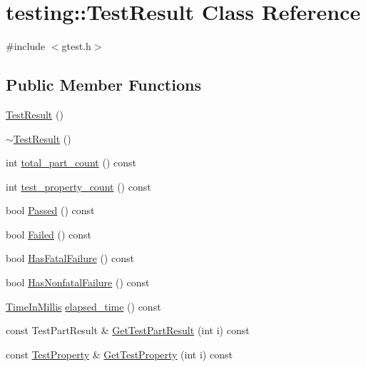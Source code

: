\hypertarget{classtesting_1_1TestResult}{}\section{testing\+::Test\+Result Class Reference}
\label{classtesting_1_1TestResult}


{\ttfamily \#include $<$gtest.\+h$>$}

\subsection*{Public Member Functions}
\begin{DoxyCompactItemize}
\item 
\mbox{\hyperlink{classtesting_1_1TestResult_a5cf5dd6f416b7334ea601aab21a2fda5}{Test\+Result}} ()
\item 
\mbox{\hyperlink{classtesting_1_1TestResult_a41f407680b725b75d7eadc3230bc3315}{$\sim$\+Test\+Result}} ()
\item 
int \mbox{\hyperlink{classtesting_1_1TestResult_a6174aa4019dcda7c34d776b5741c9032}{total\+\_\+part\+\_\+count}} () const
\item 
int \mbox{\hyperlink{classtesting_1_1TestResult_afe4523257bbea8bc63b0950b702790be}{test\+\_\+property\+\_\+count}} () const
\item 
bool \mbox{\hyperlink{classtesting_1_1TestResult_acf7e6e72f05a0545c48ea48e7f8851df}{Passed}} () const
\item 
bool \mbox{\hyperlink{classtesting_1_1TestResult_afacc37e8b43c8574e4101bc61723c769}{Failed}} () const
\item 
bool \mbox{\hyperlink{classtesting_1_1TestResult_a30e00d4076ae07fb5ad7b623d9dc1fe4}{Has\+Fatal\+Failure}} () const
\item 
bool \mbox{\hyperlink{classtesting_1_1TestResult_a510564fa67b485ed4589a259f2a032d6}{Has\+Nonfatal\+Failure}} () const
\item 
\mbox{\hyperlink{namespacetesting_a992de1d091ce660f451d1e8b3ce30fd6}{Time\+In\+Millis}} \mbox{\hyperlink{classtesting_1_1TestResult_a717e05e00d4af5cb809433e343ab63af}{elapsed\+\_\+time}} () const
\item 
const Test\+Part\+Result \& \mbox{\hyperlink{classtesting_1_1TestResult_a765c1e734ac08115757b343d57226bba}{Get\+Test\+Part\+Result}} (int i) const
\item 
const \mbox{\hyperlink{classtesting_1_1TestProperty}{Test\+Property}} \& \mbox{\hyperlink{classtesting_1_1TestResult_a6c2f478dbce36b57d18bedded46d70af}{Get\+Test\+Property}} (int i) const
\end{DoxyCompactItemize}
